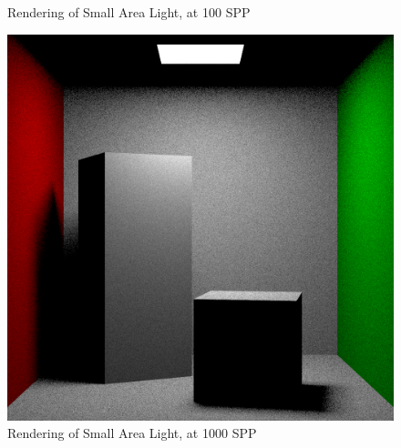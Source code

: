 \documentclass[a4paper]{myarticle}
\begin{document}
\begin{figure}[H]
\begin{minipage}[t]{.3\textwidth}
      \caption{Rendering of Small Area Light, at 100 SPP}
  \end{minipage}
  \hfill
  \begin{minipage}[t]{.3\textwidth}
      \centering
      \includegraphics[width=\textwidth]{q3/small_0_1000.png}
      \caption{Rendering of Small Area Light, at 1000 SPP}
  \end{minipage}
\end{figure}
\end{document}

